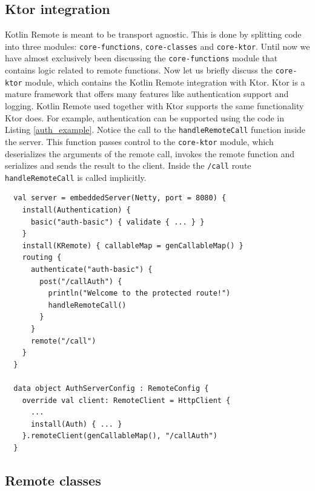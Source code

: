 \documentclass[a4paper,11pt,oneside]{article}
\newcommand{\kotlini}[1]{\texttt{#1}}
\newcommand{\ki}[1]{\kotlini{#1}}
\begin{document}
\subsection{Ktor integration}\label{ktor_integration_section}
Kotlin Remote is meant to be transport agnostic. This is done by splitting code into three modules:
\ki{core-functions}, \ki{core-classes} and \ki{core-ktor}. Until now we have almost exclusively
been discussing the \ki{core-functions} module that contains logic related to remote functions. Now let us
briefly discuss the \ki{core-ktor} module, which contains the Kotlin Remote integration with Ktor. Ktor is a
mature framework that offers many features like authentication support and logging. Kotlin Remote used
together with Ktor supports the same functionality Ktor does. For example, authentication can be
supported using the code in Listing \ref{auth_example}. Notice the call to the \ki{handleRemoteCall} function
inside the server. This function passes control to the \ki{core-ktor} module, which deserializes the arguments
of the remote call, invokes the remote function and serializes and sends the result to the client. Inside the
\ki{/call} route \ki{handleRemoteCall} is called implicitly.

\begin{listing}[!h]
  \begin{verbatim}
  val server = embeddedServer(Netty, port = 8080) {
    install(Authentication) {
      basic("auth-basic") { validate { ... } }
    }
    install(KRemote) { callableMap = genCallableMap() }
    routing {
      authenticate("auth-basic") {
        post("/callAuth") {
          println("Welcome to the protected route!")
          handleRemoteCall()
        }
      }
      remote("/call")
    }
  }

  data object AuthServerConfig : RemoteConfig {
    override val client: RemoteClient = HttpClient {
      ...
      install(Auth) { ... }
    }.remoteClient(genCallableMap(), "/callAuth")
  }
  \end{verbatim}
  \caption{Authentication support}\label{auth_example}
\end{listing}

\subsection{Remote classes}\label{remote_classes_section}
\end{document}
